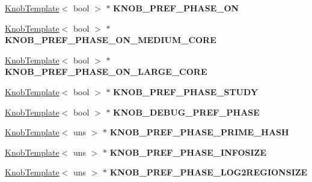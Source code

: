 \begin{DoxyCompactItemize}
\item 
\hypertarget{classall__knobs__c_abc09ac4cd4241a6824adce0aef082b09}{
\hyperlink{classKnobTemplate}{KnobTemplate}$<$ bool $>$ $\ast$ {\bfseries KNOB\_\-PREF\_\-PHASE\_\-ON}}
\label{classall__knobs__c_abc09ac4cd4241a6824adce0aef082b09}

\item 
\hypertarget{classall__knobs__c_ae416c76a0659d0667014f6f3026aaca1}{
\hyperlink{classKnobTemplate}{KnobTemplate}$<$ bool $>$ $\ast$ {\bfseries KNOB\_\-PREF\_\-PHASE\_\-ON\_\-MEDIUM\_\-CORE}}
\label{classall__knobs__c_ae416c76a0659d0667014f6f3026aaca1}

\item 
\hypertarget{classall__knobs__c_a17c74414173719dcb8e02e5fc696cfa1}{
\hyperlink{classKnobTemplate}{KnobTemplate}$<$ bool $>$ $\ast$ {\bfseries KNOB\_\-PREF\_\-PHASE\_\-ON\_\-LARGE\_\-CORE}}
\label{classall__knobs__c_a17c74414173719dcb8e02e5fc696cfa1}

\item 
\hypertarget{classall__knobs__c_adbdf8f95ead925603a06831b6c64c841}{
\hyperlink{classKnobTemplate}{KnobTemplate}$<$ bool $>$ $\ast$ {\bfseries KNOB\_\-PREF\_\-PHASE\_\-STUDY}}
\label{classall__knobs__c_adbdf8f95ead925603a06831b6c64c841}

\item 
\hypertarget{classall__knobs__c_a0c68bf82ab6d4f2c331999f2a9b28fd7}{
\hyperlink{classKnobTemplate}{KnobTemplate}$<$ bool $>$ $\ast$ {\bfseries KNOB\_\-DEBUG\_\-PREF\_\-PHASE}}
\label{classall__knobs__c_a0c68bf82ab6d4f2c331999f2a9b28fd7}

\item 
\hypertarget{classall__knobs__c_ae30bf38903defef2e4f9f8fd1cbed35b}{
\hyperlink{classKnobTemplate}{KnobTemplate}$<$ uns $>$ $\ast$ {\bfseries KNOB\_\-PREF\_\-PHASE\_\-PRIME\_\-HASH}}
\label{classall__knobs__c_ae30bf38903defef2e4f9f8fd1cbed35b}

\item 
\hypertarget{classall__knobs__c_a49665a97b287bd1892bcb06f0ddb290c}{
\hyperlink{classKnobTemplate}{KnobTemplate}$<$ uns $>$ $\ast$ {\bfseries KNOB\_\-PREF\_\-PHASE\_\-INFOSIZE}}
\label{classall__knobs__c_a49665a97b287bd1892bcb06f0ddb290c}

\item 
\hypertarget{classall__knobs__c_ab097c7da0c1b5fba9d78a1ceca0bb7f5}{
\hyperlink{classKnobTemplate}{KnobTemplate}$<$ uns $>$ $\ast$ {\bfseries KNOB\_\-PREF\_\-PHASE\_\-LOG2REGIONSIZE}}
\label{classall__knobs__c_ab097c7da0c1b5fba9d78a1ceca0bb7f5}


\end{DoxyCompactItemize}
